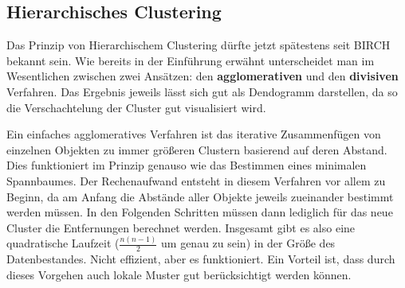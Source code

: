 \subsection{Hierarchisches Clustering}
Das Prinzip von Hierarchischem Clustering dürfte jetzt spätestens seit BIRCH
bekannt sein. Wie bereits in der Einführung erwähnt unterscheidet man
im Wesentlichen zwischen zwei Ansätzen: den \textbf{agglomerativen} und
den \textbf{divisiven} Verfahren. Das Ergebnis jeweils lässt sich
gut als Dendogramm darstellen, da so die Verschachtelung der Cluster gut 
visualisiert wird.

Ein einfaches agglomeratives Verfahren ist das iterative Zusammenfügen von
einzelnen Objekten zu immer größeren Clustern basierend auf deren Abstand.
Dies funktioniert im Prinzip genauso wie das Bestimmen eines minimalen
Spannbaumes. Der Rechenaufwand entsteht in diesem Verfahren vor allem
zu Beginn, da am Anfang die Abstände aller Objekte jeweils zueinander 
bestimmt werden müssen. In den Folgenden Schritten müssen dann
lediglich für das neue Cluster die Entfernungen berechnet werden.
Insgesamt gibt es also
eine quadratische Laufzeit (\(\frac{n(n-1)}{2}\) um genau zu sein)
in der Größe des Datenbestandes. Nicht effizient, aber 
es funktioniert. Ein Vorteil ist, dass durch dieses Vorgehen auch lokale Muster
gut berücksichtigt werden können.

